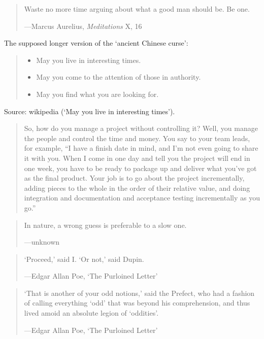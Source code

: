 \documentclass[a4paper]{article}
\begin{document}
\medskip
\begin{quote}
	Waste no more time arguing about what a good man should be.
	Be one.

	---Marcus Aurelius, {\it Meditations} X, 16
\end{quote}

\medskip
The supposed longer version of the `ancient Chinese curse':
\begin{quote}
	\begin{itemize}
		\item May you live in interesting times.
		\item May you come to the attention of those in authority.
		\item May you find what you are looking for.
	\end{itemize}
\end{quote}
Source: wikipedia (`May you live in interesting times').

\medskip
\begin{quote}
	So, how do you manage a project without
	controlling it? Well, you manage the
	people and control the time and money.
	You say to your team leads, for example,
	``I have a finish date in mind, and I'm not
	even going to share it with you. When I
	come in one day and tell you the project
	will end in one week, you have to be
	ready to package up and deliver what
	you've got as the final product. Your job
	is to go about the project incrementally,
	adding pieces to the whole in the order of
	their relative value, and doing integration
	and documentation and acceptance testing
	incrementally as you go.''~\citep{DeMarco2009}
\end{quote}

\medskip
\begin{quote}
	In nature, a wrong guess is preferable to a slow one.

	---unknown
\end{quote}

\medskip
\begin{quote}
	`Proceed,' said I.
	`Or not,' said Dupin.

	---Edgar Allan Poe, `The Purloined Letter'
\end{quote}

\medskip
\begin{quote}
	`That is another of your odd notions,' said the Prefect, who
	had a fashion of calling everything `odd' that was beyond his
	comprehension, and thus lived amoid an absolute legion of
	`oddities'.

	---Edgar Allan Poe, `The Purloined Letter'
\end{quote}
\end{document}
